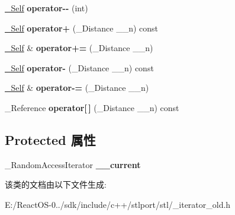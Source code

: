\begin{DoxyCompactItemize}
\mbox{\label{classreverse__iterator_a21f4b8b6e3e9af46b74ec910e5bb0a67}} 
\hyperlink{classreverse__iterator}{\+\_\+\+Self} {\bfseries operator-\/-\/} (int)
\item 
\mbox{\label{classreverse__iterator_a58b706a88f2ab0f424f077bf87b87f7c}} 
\hyperlink{classreverse__iterator}{\+\_\+\+Self} {\bfseries operator+} (\+\_\+\+Distance \+\_\+\+\_\+n) const
\item 
\mbox{\label{classreverse__iterator_a26a884af280de3f4f77b1e11718dcb99}} 
\hyperlink{classreverse__iterator}{\+\_\+\+Self} \& {\bfseries operator+=} (\+\_\+\+Distance \+\_\+\+\_\+n)
\item 
\mbox{\label{classreverse__iterator_a9aa49b863ebbca20c21126b15d42a1a7}} 
\hyperlink{classreverse__iterator}{\+\_\+\+Self} {\bfseries operator-\/} (\+\_\+\+Distance \+\_\+\+\_\+n) const
\item 
\mbox{\label{classreverse__iterator_a828c6b38599ed60011dd7019e76da917}} 
\hyperlink{classreverse__iterator}{\+\_\+\+Self} \& {\bfseries operator-\/=} (\+\_\+\+Distance \+\_\+\+\_\+n)
\item 
\mbox{\label{classreverse__iterator_a1a417497f1f1d018775fd4bfe0c19c4d}} 
\+\_\+\+Reference {\bfseries operator\mbox{[}$\,$\mbox{]}} (\+\_\+\+Distance \+\_\+\+\_\+n) const
\end{DoxyCompactItemize}
\subsection*{Protected 属性}
\begin{DoxyCompactItemize}
\item 
\mbox{\label{classreverse__iterator_abbddb06e14fae48c63a5304d8dde2aa5}} 
\+\_\+\+Random\+Access\+Iterator {\bfseries \+\_\+\+\_\+current}
\end{DoxyCompactItemize}


该类的文档由以下文件生成\+:\begin{DoxyCompactItemize}
\item 
E\+:/\+React\+O\+S-\/0../sdk/include/c++/stlport/stl/\+\_\+iterator\+\_\+old.\+h\end{DoxyCompactItemize}
